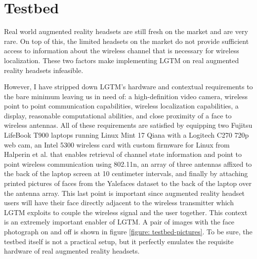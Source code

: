 \documentclass[12pt]{report}
\begin{document}
\section{Testbed}
Real world augmented reality headsets are still fresh on the market and are very rare. On top of this, the limited headsets on the market do not provide sufficient access to information about the wireless channel that is necessary for wireless localization. These two factors make implementing LGTM on real augmented reality headsets infeasible. \par

However, I have stripped down LGTM's hardware and contextual requirements to the bare minimum leaving us in need of: a high-definition video camera, wireless point to point communication capabilities, wireless localization capabilities, a display, reasonable computational abilities, and close proximity of a face to wireless antennas. All of these requirements are satisfied by equipping two Fujitsu LifeBook T900 laptops running Linux Mint 17 Qiana with a Logitech C270 720p web cam, an Intel 5300 wireless card with custom firmware for Linux from Halperin et al. \cite{ChannelStateInformationToolReleaseHalperin2011} that enables retrieval of channel state information and point to point wireless communication using 802.11n, an array of three antennas affixed to the back of the laptop screen at 10 centimeter intervals, and finally by attaching printed pictures of faces from the Yalefaces dataset \cite{FisherfacesBelhumeur1997} to the back of the laptop over the antenna array. This last point is important since augmented reality headset users will have their face directly adjacent to the wireless transmitter which LGTM exploits to couple the wireless signal and the user together. This context is an extremely important enabler of LGTM. A pair of images with the face photograph on and off is shown in figure \ref{figure: testbed-pictures}. To be sure, the testbed itself is not a practical setup, but it perfectly emulates the requisite hardware of real augmented reality headsets. \par
\end{document}
